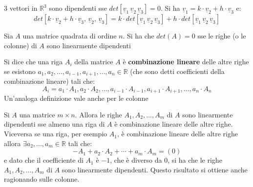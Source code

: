 \documentclass[a4paper,12pt, oneside]{book}
\begin{document}
3 vettori in $\mathbb{R}^3$ sono dipendenti sse $det[\underline{v}_1\, \underline{v}_2\, \underline{v}_3]=0$. Si ha $\underline{v}_1= k\cdot\underline{v}_2+h\cdot \underline{v}_3$ e:
$$det[k\cdot\underline{v}_2+h\cdot \underline{v}_3,\, \underline{v}_2,\, \underline{v}_3]=k\cdot det[\underline{v}_1\, \underline{v}_2\, \underline{v}_3]+h\cdot det[\underline{v}_1\, \underline{v}_2\, \underline{v}_3]$$
\begin{teorema}
Sia $A$ una matrice quadrata di ordine $n$. Si ha che $det(A)=0$ sse le righe (o le colonne) di $A$ sono linearmente dipendenti
\end{teorema}
\begin{definizione}
Si dice che una riga $A_i$ della matrice $A$  è \textbf{combinazione lineare} delle altre righe se esistono $a_1,a_2,...,a_{i-1},a_{i+1},...,a_n\in\mathbb{R}$ (che sono detti coefficienti della combinazione lineare) tali che:
$$A_i=a_1\cdot A_1,a_2\cdot A_2,...,a_{i-1}\cdot A_{i-1},a_{i+1}\cdot A_{i+1},...,a_n\cdot A_n$$
Un'analoga definizione vale anche per le colonne 
\end{definizione}
\begin{teorema}
Si $A$ una matrice $m\times n$. Allora le righe $A_1,A_2,...,A_m$ di $A$ sono linearmente dipendenti sse almeno una riga di $A$ è combinazione lineare delle altre righe.\\
Viceversa se una riga, per esempio $A_1$, è combinazione lineare delle altre righe allora $\exists a_2,...,a_m\in\mathbb{R}$ tali che:
$$-A_1+a_2\cdot A_2+\cdots+a_m\cdot A_m=(0)$$
e dato che il coefficiente di $A_1$ è $-1$, che è diverso da $0$, si ha che le righe $A_1,A_2,...,A_m$ di $A$ sono linearmente dipendenti.
Questo risultato si ottiene anche ragionando sulle colonne.
\end{teorema}
\newpage
\end{document}
